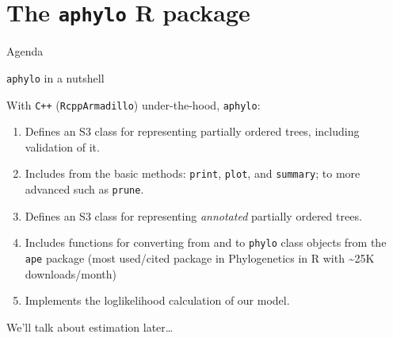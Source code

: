 \documentclass[9pt,ignorenonframetext,]{beamer}
\begin{document}
\section{\texorpdfstring{The \texttt{aphylo} R
package}{The aphylo R package}}\label{the-aphylo-r-package}

\begin{frame}[t]{Agenda}

\tableofcontents[currentsection]

\end{frame}

\begin{frame}[fragile]{\texttt{aphylo} in a nutshell}

With \texttt{C++} (\texttt{RcppArmadillo}) under-the-hood,
\texttt{aphylo}:

\begin{enumerate}
\def\labelenumi{\arabic{enumi}.}
\item
  Defines an S3 class for representing partially ordered trees,
  including validation of it.
\item
  Includes from the basic methods: \texttt{print}, \texttt{plot}, and
  \texttt{summary}; to more advanced such as \texttt{prune}.
\item
  Defines an S3 class for representing \emph{annotated} partially
  ordered trees.
\item
  Includes functions for converting from and to \texttt{phylo} class
  objects from the \texttt{ape} package (most used/cited package in
  Phylogenetics in R with \textasciitilde{}25K downloads/month)
\item
  Implements the loglikelihood calculation of our model.
\end{enumerate}

We'll talk about estimation later\ldots{}

\end{frame}
\end{document}
